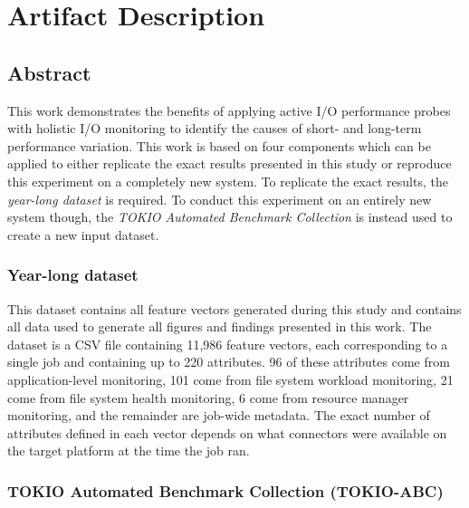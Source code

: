 \appendix

\section{Artifact Description} \label{sec:appendix/artifacts}

\subsection{Abstract}

This work demonstrates the benefits of applying active I/O performance probes with holistic I/O monitoring to identify the causes of short- and long-term performance variation.
This work is based on four components which can be applied to either replicate the exact results presented in this study or reproduce this experiment on a completely new system.
To replicate the exact results, the \emph{year-long dataset} is required.
To conduct this experiment on an entirely new system though, the \emph{TOKIO Automated Benchmark Collection} is instead used to create a new input dataset.

\subsubsection{Year-long dataset}

This dataset contains all feature vectors generated during this study and contains all data used to generate all figures and findings presented in this work.
The dataset is a CSV file containing 11,986 feature vectors, each corresponding to a single job and containing up to 220 attributes.
96 of these attributes come from application-level monitoring, 101 come from file system workload monitoring, 21 come from file system health monitoring, 6 come from resource manager monitoring, and the remainder are job-wide metadata.
The exact number of attributes defined in each
vector depends on what connectors were available on the target platform at the time the job ran.


\subsubsection{TOKIO Automated Benchmark Collection (TOKIO-ABC)}

